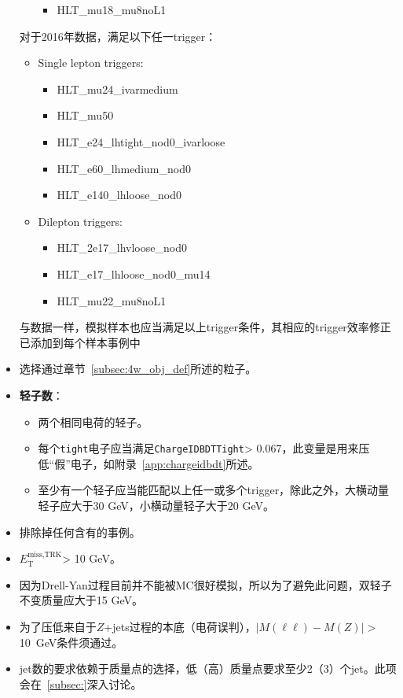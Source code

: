 \begin{itemize}
\begin{itemize}
\begin{itemize}
      \item HLT\_mu18\_mu8noL1
    \end{itemize}
  \end{itemize}
  对于2016年数据，满足以下任一trigger：
  \begin{itemize}
    \item Single lepton triggers:
    \begin{itemize}
      \item HLT\_mu24\_ivarmedium
      \item HLT\_mu50
      \item HLT\_e24\_lhtight\_nod0\_ivarloose
      \item HLT\_e60\_lhmedium\_nod0
      \item HLT\_e140\_lhloose\_nod0
    \end{itemize}
    \item Dilepton triggers:
    \begin{itemize}
      \item HLT\_2e17\_lhvloose\_nod0
      \item HLT\_e17\_lhloose\_nod0\_mu14
      \item HLT\_mu22\_mu8noL1
    \end{itemize}
  \end{itemize}
与数据一样，模拟样本也应当满足以上trigger条件，其相应的trigger效率修正已添加到每个样本事例中
  \item 选择通过章节~\ref{subsec:4w_obj_def}所述的粒子。
  \item \textbf{轻子数}：
	\begin{itemize}
	      \item 两个相同电荷的轻子。
	      \item 每个\texttt{tight}电子应当满足\texttt{ChargeIDBDTTight}> 0.067，此变量是用来压低“假”电子，如附录~\ref{app:chargeidbdt}所述。
	      \item 至少有一个轻子应当能匹配以上任一或多个trigger，除此之外，大横动量轻子\pt 应大于30 GeV，小横动量轻子大于20 GeV。
	\end{itemize}
  \item 排除掉任何含有\bjet 的事例。
  \item $E_{\text{T}}^{\text{miss,TRK}}$> 10 GeV。
  \item 因为Drell-Yan过程目前并不能被MC很好模拟，所以为了避免此问题，双轻子不变质量应大于15 GeV。
  \item 为了压低来自于$Z$+jets过程的本底（电荷误判），$|M(\ell\ell)-M(Z)|>$10~GeV条件须通过。
  \item jet数的要求依赖于质量点的选择，低（高）质量点要求至少2（3）个jet。此项会在~\ref{subsec:}深入讨论。
\end{itemize}
